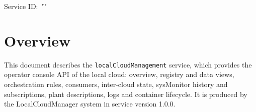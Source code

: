 \documentclass[a4paper]{arrowhead}
\begin{document}
\sloppy

\ArrowheadSetup

\begin{center}
  \vspace*{1cm}
  \huge{\arrowtitle}

  \vspace*{0.2cm}
  \LARGE{\arrowtype}
  \vspace*{1cm}

  \Large{Service ID: \textit{"\arrowid"}}

  \vspace*{\fill}


  \vspace*{1cm}
  \vspace*{\fill}

  \begin{abstract}
    This document describes the \texttt{local\allowbreak{}Cloud\allowbreak{}Management} service, version 1.0.0, produced by the LocalCloudManager support system of Arrowhead 5.2.2.
  \end{abstract}

  \vspace*{1cm}
\end{center}

\newpage

\tableofcontents
\newpage

\section{Overview}
\label{sec:overview}

This document describes the \texttt{local\allowbreak{}Cloud\allowbreak{}Management} service, which provides the operator console API of the local cloud: overview, registry and data views, orchestration rules, consumers, inter-cloud state, sysMonitor history and subscriptions, plant descriptions, logs and container lifecycle.
It is produced by the LocalCloudManager system \cite{lcm-sysd} in service version 1.0.0.
\end{document}
